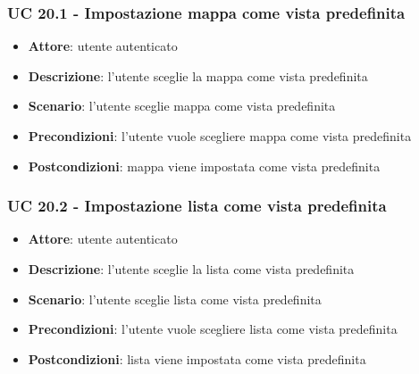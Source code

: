 \subsubsection{UC 20.1 - Impostazione mappa come vista predefinita}
\begin{itemize}
    \item \textbf{Attore}: utente autenticato
    \item \textbf{Descrizione}: l’utente sceglie la mappa come vista predefinita
    \item \textbf{Scenario}: l’utente sceglie mappa come vista predefinita
    \item \textbf{Precondizioni}: l’utente vuole scegliere mappa come vista predefinita
    \item \textbf{Postcondizioni}: mappa viene impostata come vista predefinita
\end{itemize}

\subsubsection{UC 20.2 - Impostazione lista come vista predefinita}
\begin{itemize}
    \item \textbf{Attore}: utente autenticato
    \item \textbf{Descrizione}: l’utente sceglie la lista come vista predefinita
    \item \textbf{Scenario}: l’utente sceglie lista come vista predefinita
    \item \textbf{Precondizioni}: l’utente vuole scegliere lista come vista predefinita
    \item \textbf{Postcondizioni}: lista viene impostata come vista predefinita
\end{itemize}






